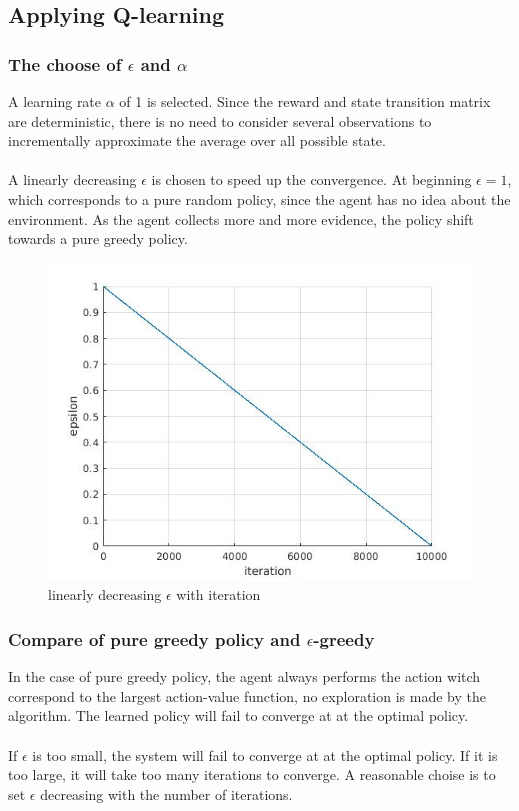 \documentclass{article}
\begin{document}
\newpage

\subsection{Applying Q-learning}
\subsubsection{The choose of $\epsilon$ and $\alpha$}
A learning rate $\alpha$ of 1 is selected. Since the reward and state transition matrix are deterministic, there is no need to consider several observations to incrementally approximate the average over all possible state. 
\\ \\
A linearly decreasing $\epsilon$ is chosen to speed up the convergence. At beginning $\epsilon=1$, which corresponds to a pure random policy, since the agent has no idea about the environment. As the agent collects more and more evidence, the policy shift towards a pure greedy policy.
\begin{figure}[ht]
	\centering
	\includegraphics[width=0.7\linewidth]{line.jpg} 
	\caption{linearly decreasing $\epsilon$ with iteration}  	
\end{figure}  

\subsubsection{Compare of pure greedy policy and $\epsilon$-greedy}
In the case of pure greedy policy, the agent always performs the action witch correspond to the largest action-value function, no exploration is made by the algorithm. The learned policy will fail to converge at at the optimal policy.
\\ \\
If $\epsilon$ is too small, the system will fail to converge at at the optimal policy. If it is too large, it will take too many iterations to converge. A reasonable choise is to set $\epsilon$ decreasing with the number of iterations.
\end{document}
